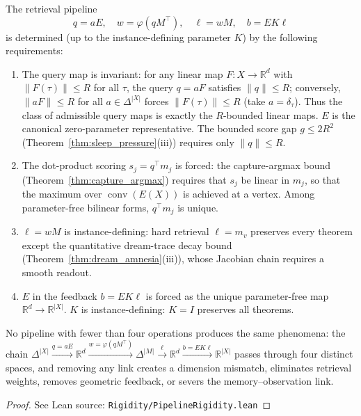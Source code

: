 \begin{proposition}
\label{prop:pipeline_rigidity}
\leanok
{}
The retrieval pipeline
\[
q = aE, \quad w = \varphi(qM^\top), \quad \ell = wM, \quad b = EK\ell
\]
is determined (up to the instance-defining parameter $K$) by the following requirements:
\begin{enumerate}
\item The query map is invariant: for any linear map $F\colon X \to \mathbb{R}^d$ with $\|F(\tau)\| \leq R$ for all $\tau$, the query $q = aF$ satisfies $\|q\| \leq R$; conversely, $\|aF\| \leq R$ for all $a \in \Delta^{|X|}$ forces $\|F(\tau)\| \leq R$ (take $a = \delta_\tau$).  Thus the class of admissible query maps is exactly the $R$-bounded linear maps.  $E$ is the canonical zero-parameter representative.  The bounded score gap $g \leq 2R^2$ (Theorem~\ref{thm:sleep_pressure}(iii)) requires only $\|q\| \leq R$.
\item The dot-product scoring $s_j = q^\top m_j$ is forced: the capture-argmax bound (Theorem~\ref{thm:capture_argmax}) requires that $s_j$ be linear in $m_j$, so that the maximum over $\operatorname{conv}(E(X))$ is achieved at a vertex.  Among parameter-free bilinear forms, $q^\top m_j$ is unique.
\item $\ell = wM$ is instance-defining: hard retrieval $\ell = m_v$ preserves every theorem except the quantitative dream-trace decay bound (Theorem~\ref{thm:dream_amnesia}(iii)), whose Jacobian chain requires a smooth readout.
\item $E$ in the feedback $b = EK\ell$ is forced as the unique parameter-free map $\mathbb{R}^d \to \mathbb{R}^{|X|}$.  $K$ is instance-defining: $K = I$ preserves all theorems.
\end{enumerate}
No pipeline with fewer than four operations produces the same phenomena: the chain $\Delta^{|X|} \xrightarrow{q=aE} \mathbb{R}^d \xrightarrow{w=\varphi(qM^\top)} \Delta^{|M|} \xrightarrow{\ell} \mathbb{R}^d \xrightarrow{b=EK\ell} \mathbb{R}^{|X|}$ passes through four distinct spaces, and removing any link creates a dimension mismatch, eliminates retrieval weights, removes geometric feedback, or severs the memory--observation link.
\end{proposition}

\begin{proof}
\leanok
{}
See Lean source: \texttt{Rigidity/PipelineRigidity.lean}
\end{proof}

